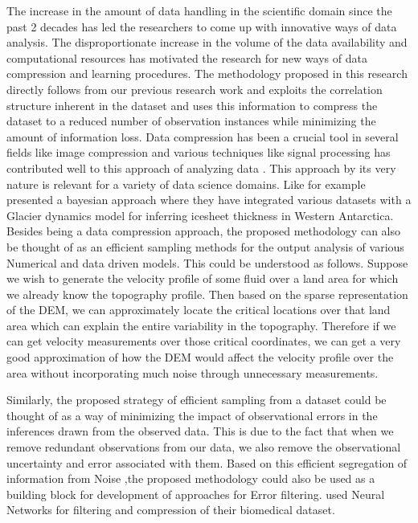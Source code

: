\documentclass[procedia]{easychair}
\begin{document}
The increase in the amount of data handling in the scientific domain since the past 2 decades has led the researchers to come up with innovative ways of data analysis. The disproportionate increase in the volume of the data availability and computational resources has motivated the research for new ways of data compression and learning procedures. The methodology proposed in this research directly follows from our previous research work \cite{patra2016multilevel} and exploits the correlation structure inherent in the dataset and uses this information to compress the dataset to a reduced number of observation instances while minimizing the amount of information loss. Data compression has been a crucial tool in several fields like image compression \cite{rufai2014lossy} and various techniques like signal processing has contributed well to this approach of analyzing data \cite{sandryhaila2014big}. This approach by its very nature is relevant for a variety of data science domains. Like for example \cite{guan2016inferring} presented a bayesian approach where they have integrated various datasets with a Glacier dynamics model for inferring icesheet thickness in Western Antarctica. Besides being a data compression approach, the proposed methodology can also be thought of as an efficient sampling methods for the output analysis of various Numerical and data driven models. This could be understood as follows. Suppose we wish to generate the velocity profile of some fluid over a land area for which we already know the topography profile. Then based on the sparse representation of the DEM, we can approximately locate the critical locations over that land area which can explain the entire variability in the topography. Therefore if we can get velocity measurements over those critical coordinates, we can get a very good approximation of how the DEM would affect the velocity profile over the area without incorporating much noise through unnecessary measurements.

Similarly, the proposed strategy of efficient sampling from a dataset could be thought of as a way of minimizing the impact of observational errors in the inferences drawn from the observed data. This is due to the fact that when we remove redundant observations from our data, we also remove the observational uncertainty and error associated with them. Based on this efficient segregation of information from Noise ,the proposed methodology could also be used as a building block for development of approaches for Error filtering. \cite{chatterjee2013adaptive} used Neural Networks for filtering and compression of their biomedical dataset.
\end{document}
